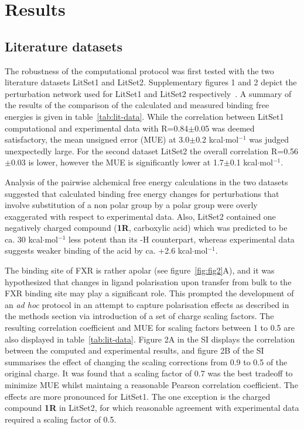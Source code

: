 \documentclass{svjour3}                     %
\begin{document}
\section{Results}

\subsection{Literature datasets}
The robustness of the computational protocol was first tested with the two literature datasets LitSet1 and LitSet2.  Supplementary figures 1 and 2 depict the perturbation network used for LitSet1 and LitSet2 respectively~\cite{SI}. A summary of the results of the comparison of the calculated and measured binding free energies is given in table~\ref{tab:lit-data}. While the correlation between LitSet1 computational and experimental data with R=0.84$\pm$0.05 was deemed satisfactory, the mean unsigned error (MUE) at 3.0$\pm$0.2 kcal$\cdot$mol$^{-1}$ was judged unexpectedly large. For the second dataset LitSet2 the overall correlation R=0.56$\pm$0.03 is lower, however the MUE is significantly lower at 1.7$\pm$0.1 kcal$\cdot$mol$^{-1}$.

Analysis of the pairwise alchemical free energy calculations in the two datasets suggested 
that calculated binding free energy changes for perturbations that involve substitution of a non polar group by a polar group were overly exaggerated with respect to experimental data.  Also, LitSet2 contained one negatively charged compound (\textbf{1R}, carboxylic acid) which was predicted to be ca. 30 kcal$\cdot$mol$^{-1}$ less potent than its -H counterpart, whereas experimental data suggests weaker binding of the acid by ca. +2.6 kcal$\cdot$mol$^{-1}$.

The binding site of FXR is rather apolar (see figure~\ref{fig:fig2}A), and it was hypothesized that changes in ligand polarisation upon transfer from bulk to the FXR binding site may play a significant role. This prompted the development of an \textit{ad hoc} protocol in an attempt to capture polarisation effects as described in the methods section via introduction of a set of charge scaling factors. The resulting correlation coefficient and MUE for scaling factors between 1 to 0.5 are also displayed in table~\ref{tab:lit-data}. Figure 2A in the SI displays the correlation between the computed and experimental results, and figure 2B of the SI summarises the effect of changing the scaling corrections from 0.9 to 0.5 of the original charge. 
It was found that a scaling factor of 0.7 was the best tradeoff to minimize MUE whilst maintaing a reasonable Pearson correlation coefficient. The effects are more pronounced for LitSet1. The one exception is the charged compound \textbf{1R} in LitSet2, for which reasonable agreement with experimental data required a scaling factor of 0.5. 
\end{document}
